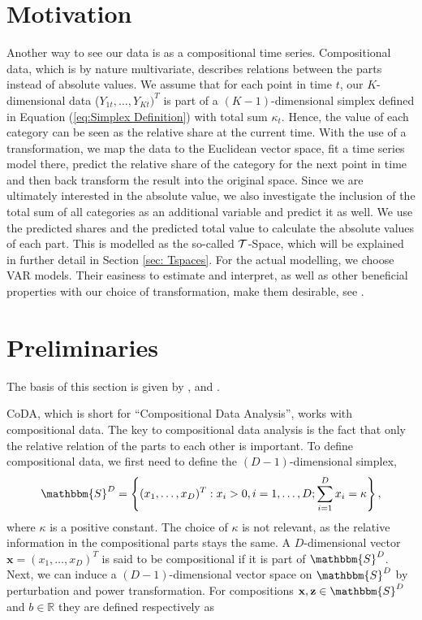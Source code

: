 \section{Motivation}
\label{sec: Coda Motivation}

Another way to see our data is as a compositional time series. Compositional data, which is by nature multivariate, describes relations between the parts instead of absolute values. We assume that for each point in time $t$, our $K$-dimensional data ($Y_{1t},\ldots,Y_{Kt})^T$ is part of a $(K-1)$-dimensional simplex defined in Equation (\ref{eq:Simplex Definition}) with total sum $\kappa_t$. Hence, the value of each category can be seen as the relative share at the current time. With the use of a transformation, we map the data to the Euclidean vector space, fit a time series model there, predict the relative share of the category for the next point in time and then back transform the result into the original space. Since we are ultimately interested in the absolute value, we also investigate the inclusion of the total sum of all categories as an additional variable and predict it as well. We use the predicted shares and the predicted total value to calculate the absolute values of each part. This is modelled as the so-called $\mathcal{T}$-Space, which will be explained in further detail in Section \ref{sec: Tspaces}. For the actual modelling, we choose VAR models. Their easiness to estimate and interpret, as well as other beneficial properties with our choice of transformation, make them desirable, see \textcite{Kynclova:2015}. 


\section{Preliminaries}
\label{sec: Coda Preliminaries}
The basis of this section is given by \textcite{Kynclova:2015}, \textcite{Egozcue:2003} and \textcite{Filzmoser:2020}.

CoDA, which is short for ``Compositional Data Analysis'', works with compositional data. The key to compositional data analysis is the fact that only the relative relation of the parts to each other is important. To define compositional data, we first need to define the $(D-1)$-dimensional simplex,
	\begin{equation}
	\mathbbm{S}^D = \left\{(x_1,\ldots, x_D)^T: x_i > 0, i =1,\ldots,D; \sum_{i=1}^{D}x_i=\kappa  \right\},
	\label{eq:Simplex Definition}
	\end{equation}
%
where $\kappa$ is a positive constant. The choice of $\kappa$ is not relevant, as the relative information in the compositional parts stays the same.  A $D$-dimensional vector $\textbf{x} = (x_1,\ldots,x_D)^T$ is said to be compositional if it is part of $\mathbbm{S}^D$. Next, we can induce a $(D-1)$-dimensional vector space on $\mathbbm{S}^D$ by perturbation and power transformation. For compositions $\textbf{x},\textbf{z} \in \mathbbm{S}^D$ and $b \in \mathbb{R}$ they are defined respectively as 

